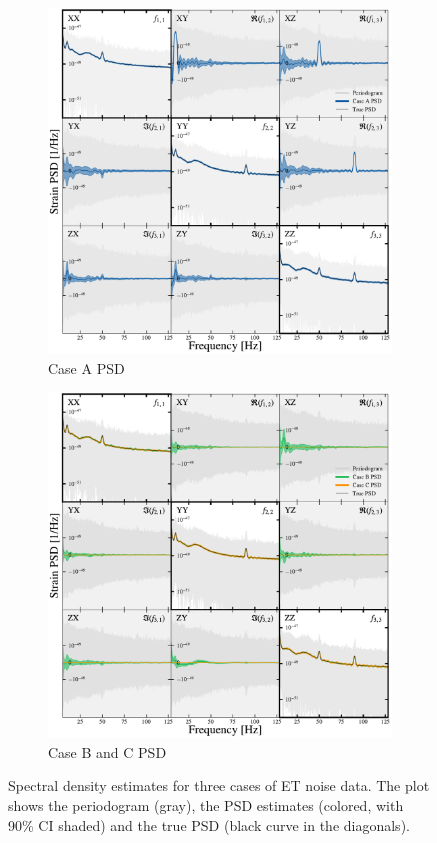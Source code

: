 \documentclass[%
 reprint,
 amsmath,amssymb,
 aps,
 nofootinbib,
]{revtex4-2}
\begin{document}
\begin{figure}[]
\centering
\begin{subfigure}{\columnwidth}
  \centering
  \includegraphics[width=1.05\columnwidth]{caseA_psd.pdf}
  \caption{Case A PSD}
  \label{fig:caseA_psd}
\end{subfigure}
\hfill
\begin{subfigure}{\columnwidth}
  \centering
  \includegraphics[width=1.05\columnwidth]{caseBC_psd.pdf}
  \caption{Case B and C PSD}
  \label{fig:caseBC_psd}
\end{subfigure}
\caption{Spectral density estimates for three cases of ET noise data. The plot shows the periodogram (gray), the PSD estimates (colored, with 90\% CI shaded) and the true PSD (black curve in the diagonals).}
\label{fig:ET_PSDS}
\end{figure}
\end{document}
